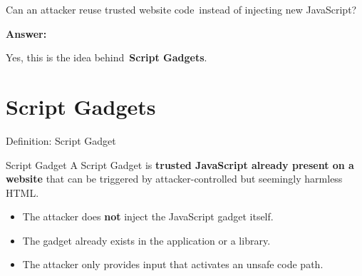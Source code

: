 \documentclass[%
font=nexus,
aspectratio=169,
language=english
]{tubsCD/tubscd}
\begin{document}
\begin{frame}[plain]
\centering
\vfill

{\Huge Can an attacker reuse trusted website code\
instead of injecting new JavaScript?\par}

\vfill

{\Large\bfseries Answer:\par}

\vspace{0.8em}

{\LARGE Yes, this is the idea behind\ \textbf{Script Gadgets}.\par}

\vfill
\end{frame}


\section{Script Gadgets}

\begin{frame}{Definition: Script Gadget}
\begin{block}{Script Gadget \citep{lekies2017scriptgadgets}}
A Script Gadget is \textbf{trusted JavaScript already present on a website} that can be triggered by attacker-controlled but seemingly harmless HTML.
\end{block}

\vspace{0.7em}

\begin{itemize}
\item The attacker does \textbf{not} inject the JavaScript gadget itself.
\item The gadget already exists in the application or a library.
\item The attacker only provides input that activates an unsafe code path.
\end{itemize}
\end{frame}
\end{document}
